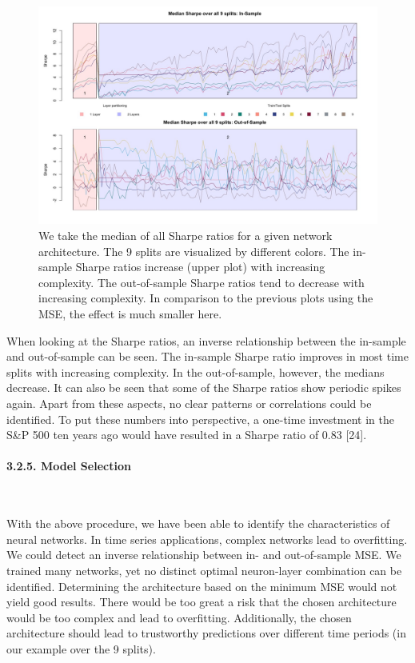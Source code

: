 \documentclass[
]{article}
\begin{document}
\begin{figure}

{\centering \includegraphics[width=1\linewidth]{images/batch5/median_sharpe} 

}

\caption{We take the median of all Sharpe ratios for a given network architecture. The 9 splits are visualized by different colors. The in-sample Sharpe ratios increase (upper plot) with increasing complexity. The out-of-sample Sharpe ratios tend to decrease with increasing complexity. In comparison to the previous plots using the MSE, the effect is much smaller here.}\label{fig:sharpe_median}
\end{figure}

When looking at the Sharpe ratios, an inverse relationship between the
in-sample and out-of-sample can be seen. The in-sample Sharpe ratio
improves in most time splits with increasing complexity. In the
out-of-sample, however, the medians decrease. It can also be seen that
some of the Sharpe ratios show periodic spikes again. Apart from these
aspects, no clear patterns or correlations could be identified. To put
these numbers into perspective, a one-time investment in the S\&P 500
ten years ago would have resulted in a Sharpe ratio of 0.83 {[}24{]}.

\newpage

\hypertarget{mod-select}{%
\paragraph{3.2.5. Model Selection}\label{mod-select}}

~

With the above procedure, we have been able to identify the
characteristics of neural networks. In time series applications, complex
networks lead to overfitting. We could detect an inverse relationship
between in- and out-of-sample MSE. We trained many networks, yet no
distinct optimal neuron-layer combination can be identified. Determining
the architecture based on the minimum MSE would not yield good results.
There would be too great a risk that the chosen architecture would be
too complex and lead to overfitting. Additionally, the chosen
architecture should lead to trustworthy predictions over different time
periods (in our example over the 9 splits).
\end{document}
